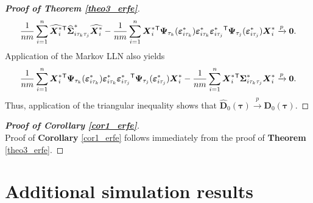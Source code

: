 \documentclass[15pt,a4paper]{article}
\newcommand{\transpose}{{}^{\text{\sffamily T}}}
\begin{document}
\begin{proof}[\textbf{Proof of Theorem \ref{theo3_erfe}}]
\begin{equation*}
    \frac{1}{nm}\sum_{i=1}^{n}\widehat{\boldsymbol{X}^{*}_i}\transpose\widehat{\boldsymbol{\Sigma}}^{*}_{i\tau_{k}\tau_{j}}\widehat{\boldsymbol{X}^{*}_i} -  \frac{1}{nm}\sum_{i=1}^{n}
    \boldsymbol{X}^{*}_i\transpose\boldsymbol{\Psi}_{\tau_k}(\boldsymbol{\varepsilon}^{*}_{i\tau_{k}})\boldsymbol{\varepsilon}^{*}_{i\tau_{k}}
    \boldsymbol{\varepsilon}^{*}_{i\tau_{j}}\transpose\boldsymbol{\Psi}_{\tau_j} 
        (\boldsymbol{\varepsilon}^{*}_{i\tau_{j}})\boldsymbol{X}^{*}_i
\xrightarrow{p} \boldsymbol{0}.
\end{equation*}
Application of the Markov LLN also yields
\begin{equation*}
    \frac{1}{nm}\sum_{i=1}^{n}\boldsymbol{X}^{*}_i\transpose\boldsymbol{\Psi}_{\tau_k}(\boldsymbol{\varepsilon}^{*}_{i\tau_{k}})\boldsymbol{\varepsilon}^{*}_{i\tau_{k}}\boldsymbol{\varepsilon}^{*}_{i\tau_{j}}\transpose\boldsymbol{\Psi}_{\tau_j} 
        (\boldsymbol{\varepsilon}^{*}_{i\tau_{j}})\boldsymbol{X}^{*}_i -  
    \frac{1}{nm}\sum_{i=1}^{n}\boldsymbol{X}^{*}_i\transpose \boldsymbol{\Sigma}_{i\tau_{k}\tau_{j}}^{*} \boldsymbol{X}^{*}_i \xrightarrow{p} \boldsymbol{0}.
\end{equation*}
Thus, application of the triangular inequality shows that $\widehat{\boldsymbol{D}}_{0}(\boldsymbol{\tau})\xrightarrow{p}\boldsymbol{D}_{0}(\boldsymbol{\tau}).$
\end{proof}
\begin{proof}[\textbf{Proof of Corollary \ref{cor1_erfe}}]$ $
~~\\
Proof of \textbf{Corollary} \ref{cor1_erfe} follows immediately from the proof of \textbf{Theorem} \ref{theo3_erfe}.
\end{proof}


\section{Additional simulation results}
\end{document}

